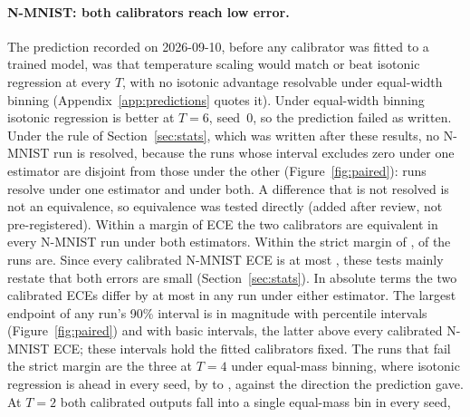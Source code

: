 \documentclass[10pt]{article}
\begin{document}
\paragraph{N-MNIST: both calibrators reach low error.} The prediction recorded on 2026-09-10, before any
calibrator was fitted to a trained model, was that temperature scaling would match or beat
isotonic regression at every $T$, with no isotonic advantage resolvable under equal-width binning
(Appendix~\ref{app:predictions} quotes it). Under equal-width binning isotonic regression is
better at $T=6$, seed~0, so the prediction failed as written. Under the rule of %
Section~\ref{sec:stats}, which was written after these results, no N-MNIST run is resolved, because
the runs whose interval excludes zero under one estimator are disjoint from those under the other
(Figure~\ref{fig:paired}): \resolveEither{} runs resolve under one estimator and \resolveBoth{} %
under both. A difference that is not resolved is not an equivalence, so equivalence was tested
directly (added after review, not pre-registered). Within a margin of \deltaMid{} ECE the two %
calibrators are equivalent in every N-MNIST run under both estimators. Within the strict margin of %
\deltaStrict, \tostNmBothStrict{} of the \tostNmRuns{} runs are. Since every calibrated N-MNIST %
ECE is at most \maxCalEceNm, these tests mainly restate that both errors are small %
(Section~\ref{sec:stats}). In absolute terms the two calibrated ECEs differ by at most %
\nmAbsDiffMax{} in any run under either estimator. The largest endpoint of any run's 90\% %
interval is \tostNmWidest{} in magnitude with percentile intervals (Figure~\ref{fig:paired}) and %
\tostNmWidestBasic{} with basic intervals, the latter above every calibrated N-MNIST ECE; these %
intervals hold the fitted calibrators fixed. The runs that fail the strict margin are the three at $T=4$ %
under equal-mass binning, where isotonic regression is ahead in every seed, by \emFourIsoMin{} to %
\emFourIsoMax, against the direction the prediction gave. At $T=2$ both calibrated outputs fall into a single equal-mass bin in every seed, %
\end{document}
